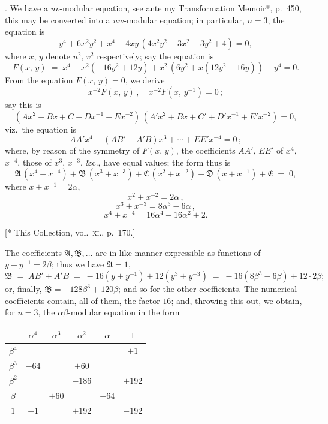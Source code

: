 \documentclass[11pt]{article}
\begin{document}
\medskip

. We have a $u v$-modular equation, see ante my Transformation Memoir*, p.\ 450, this may be converted into a $uw$-modular equation; in particular, $n=3$, the equation is
\[
y^4 + 6x^2 y^2 + x^4 - 4xy\,(4x^2y^2 - 3x^2 - 3y^2 + 4) = 0,
\]
where $x$, $y$ denote $u^2$, $v^2$ respectively; say the equation is
\[
F(x,\,y) \;=\; x^4 + x^2(-16y^2 + 12y) + x^2\,(6y^2 + x(12y^2 - 16y)) + y^4 = 0.
\]
From the equation $F(x,\,y) = 0$, we derive
\[
x^{-2} F(x,\,y)\,,\quad x^{-2} F(x,\,y^{-1}) = 0\,;
\]
say this is
\[
(Ax^2 + Bx + C + Dx^{-1} + Ex^{-2})\,(A'x^2 + Bx + C' + D'x^{-1} + E'x^{-2}) = 0,
\]
viz.\ the equation is
\[
AA'x^4 + (AB' + A'B)x^3 + \cdots + EE'x^{-4} = 0\,;
\]
where, by reason of the symmetry of $F(x,\,y)$, the coefficients $AA'$, $EE'$ of $x^4$, $x^{-4}$, those of $x^3$, $x^{-3}$, \&c., have equal values; the form thus is
\[
\mathfrak{A}\,(x^4 + x^{-4}) + \mathfrak{B}\,(x^3 + x^{-3}) + \mathfrak{C}\,(x^2 + x^{-2}) + \mathfrak{D}\,(x + x^{-1}) + \mathfrak{E} \;=\; 0,
\]
where $x + x^{-1} = 2\alpha$,
\[
x^2 + x^{-2} = 2\alpha\,,
\]
\[
x^3 + x^{-3} = 8\alpha^3 - 6\alpha\,,
\]
\[
x^4 + x^{-4} = 16\alpha^4 - 16\alpha^2 + 2.
\]

\hfill {\footnotesize [* This Collection, vol.~\textsc{xi}., p.\ 170.]}

\newpage

\noindent The coefficients $\mathfrak{A}, \mathfrak{B}, \ldots$ are in like manner expressible as functions of $y + y^{-1} = 2\beta$; thus we have $\mathfrak{A} = 1$,
\[
\mathfrak{B} \;=\; AB' + A'B \;=\; -16(y + y^{-1}) + 12(y^3 + y^{-3}) \;=\; -16(8\beta^3 - 6\beta) + 12\cdot 2\beta;
\]
or, finally, $\mathfrak{B} = -128\beta^3 + 120\beta$; and so for the other coefficients. The numerical coefficients contain, all of them, the factor $16$; and, throwing this out, we obtain, for $n=3$, the $\alpha\beta$-modular equation in the form

\begin{center}
\begin{tabular}{|c|c|c|c|c|c|}
\hline
 & $\alpha^4$ & $\alpha^3$ & $\alpha^2$ & $\alpha$ & $1$ \\
\hline
$\beta^4$ & & & & & $+1$ \\
\hline
$\beta^3$ & $-64$ & & $+60$ & & \\
\hline
$\beta^2$ & & & $-186$ & & $+192$ \\
\hline
$\beta$ & & $+60$ & & $-64$ & \\
\hline
$1$ & $+1$ & & $+192$ & & $-192$ \\
\hline
\end{tabular}
\end{center}
\end{document}
